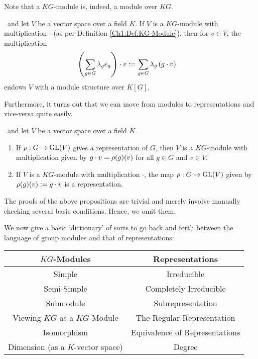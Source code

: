 Note that a $KG$-module is, indeed, a module over $KG$.

\begin{proposition}
    \ and let $V$ be a vector space over a field $K$. If $V$ is a $KG$-module with multiplication $\cdot$ (as per Definition \ref{Ch1:Def:KG-Module}), then for $v \in V$, the multiplication
    \begin{align*}
        \left( \sum_{g \in G} \lambda_g e_g \right) \cdot v &:= \sum_{g \in G} \lambda_g \left( g \cdot v \right)
    \end{align*}
    endows $V$ with a module structure over $K[G]$.
\end{proposition}

Furthermore, it turns out that we can move from modules to representations and vice-versa quite easily.

\begin{proposition}
    \ and let $V$ be a vector space over a field $K$.
    \begin{enumerate}[label = \normalfont \arabic*.]
        \item If $\rho : G \to \operatorname{GL}\!\left( V \right)$ gives a representation of $G$, then $V$ is a $KG$-module with multiplication given by $g \cdot v = \rho\!\left( g \right)\!\left( v \right)$ for all $g \in G$ and $v \in V$.
        \item If $V$ is a $KG$-module with multiplication $\cdot$, the map $\rho : G \to \operatorname{GL}\!\left( V \right)$ given by $\rho\!\left( g \right)\!\left( v \right) := g \cdot v$ is a representation.
    \end{enumerate}
\end{proposition}

The proofs of the above propositions are trivial and merely involve manually checking several basic conditions. Hence, we omit them.

We now give a basic `dictionary' of sorts to go back and forth between the language of group modules and that of representations:

\begin{table}[!h]
    \centering
    \begin{tabular}{c|c}
        \textbf{$KG$-Modules} & \textbf{Representations} \\ \hline
        Simple & Irreducible \\
        Semi-Simple & Completely Irreducible \\
        Submodule & Subrepresentation \\
        Viewing $KG$ as a $KG$-Module & The Regular Representation \\
        Isomorphism & Equivalence of Representations \\
        Dimension (as a $K$-vector space) & Degree
    \end{tabular}
\end{table}


